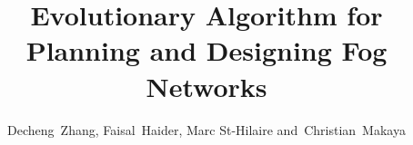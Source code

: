 \documentclass[10pt,journal,compsoc]{IEEEtran}
\begin{document}
%
\title{Evolutionary Algorithm for Planning and Designing Fog Networks}
%
%
%
%

\author{Decheng~Zhang, %
        Faisal~Haider, %
        Marc St-Hilaire %
        and~Christian~Makaya%

}
\end{document}
